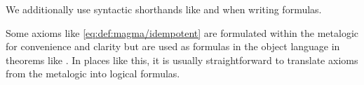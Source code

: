 \begin{remark}
\begin{thmenum}
     We additionally use syntactic shorthands like  and  when writing formulas.
  \end{thmenum}

  Some axioms like \eqref{eq:def:magma/idempotent} are formulated within the metalogic for convenience and clarity but are used as formulas in the object language in theorems like . In places like this, it is usually straightforward to translate axioms from the metalogic into logical formulas.
\end{remark}
